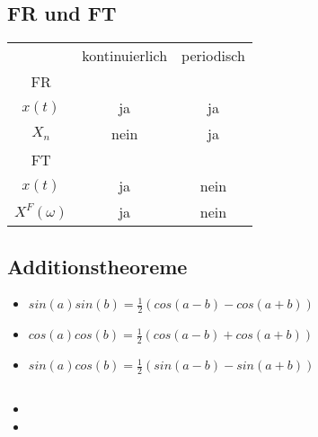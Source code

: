 \documentclass{article}
\begin{document}
\subsection{FR und FT}
\begin{tabular}{ c| c| c }
& kontinuierlich & periodisch \\
FR & & \\ \hline
$x(t)$ & ja & ja \\
 $X_n$ &nein& ja\\
 FT & & \\ \hline
 $x(t)$ & ja & nein \\
 $X^F(\omega)$ & ja & nein \\
\end{tabular}






\subsection{Additionstheoreme}
\begin{itemize}
\item $sin(a)sin(b)=\frac{1}{2} (cos(a-b)-cos(a+b))$
\item $cos(a)cos(b)=\frac{1}{2} (cos(a-b)+cos(a+b))$
\item $sin(a)cos(b)=\frac{1}{2} (sin(a-b)-sin(a+b))$
\end{itemize}


\subsection{}
\begin{itemize}
\item
\item
\end{itemize}
\end{document}
